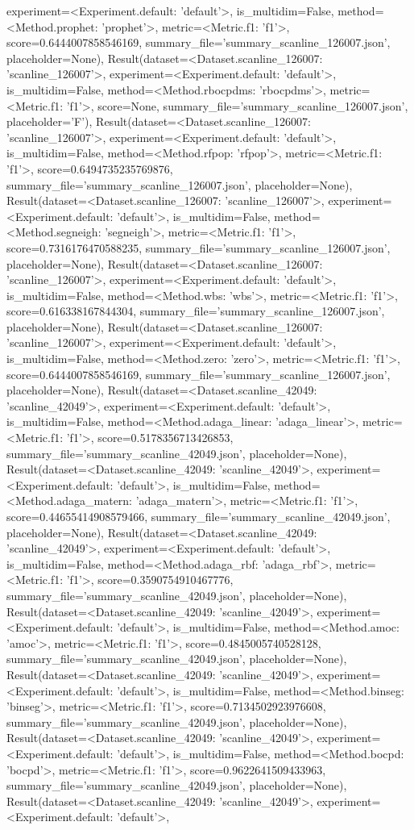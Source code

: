 experiment=<Experiment.default: 'default'>, is_multidim=False, method=<Method.prophet: 'prophet'>, metric=<Metric.f1: 'f1'>, score=0.6444007858546169, summary_file='summary_scanline_126007.json', placeholder=None), Result(dataset=<Dataset.scanline_126007: 'scanline_126007'>, experiment=<Experiment.default: 'default'>, is_multidim=False, method=<Method.rbocpdms: 'rbocpdms'>, metric=<Metric.f1: 'f1'>, score=None, summary_file='summary_scanline_126007.json', placeholder='F'), Result(dataset=<Dataset.scanline_126007: 'scanline_126007'>, experiment=<Experiment.default: 'default'>, is_multidim=False, method=<Method.rfpop: 'rfpop'>, metric=<Metric.f1: 'f1'>, score=0.6494735235769876, summary_file='summary_scanline_126007.json', placeholder=None), Result(dataset=<Dataset.scanline_126007: 'scanline_126007'>, experiment=<Experiment.default: 'default'>, is_multidim=False, method=<Method.segneigh: 'segneigh'>, metric=<Metric.f1: 'f1'>, score=0.7316176470588235, summary_file='summary_scanline_126007.json', placeholder=None), Result(dataset=<Dataset.scanline_126007: 'scanline_126007'>, experiment=<Experiment.default: 'default'>, is_multidim=False, method=<Method.wbs: 'wbs'>, metric=<Metric.f1: 'f1'>, score=0.616338167844304, summary_file='summary_scanline_126007.json', placeholder=None), Result(dataset=<Dataset.scanline_126007: 'scanline_126007'>, experiment=<Experiment.default: 'default'>, is_multidim=False, method=<Method.zero: 'zero'>, metric=<Metric.f1: 'f1'>, score=0.6444007858546169, summary_file='summary_scanline_126007.json', placeholder=None), Result(dataset=<Dataset.scanline_42049: 'scanline_42049'>, experiment=<Experiment.default: 'default'>, is_multidim=False, method=<Method.adaga_linear: 'adaga_linear'>, metric=<Metric.f1: 'f1'>, score=0.5178356713426853, summary_file='summary_scanline_42049.json', placeholder=None), Result(dataset=<Dataset.scanline_42049: 'scanline_42049'>, experiment=<Experiment.default: 'default'>, is_multidim=False, method=<Method.adaga_matern: 'adaga_matern'>, metric=<Metric.f1: 'f1'>, score=0.44655414908579466, summary_file='summary_scanline_42049.json', placeholder=None), Result(dataset=<Dataset.scanline_42049: 'scanline_42049'>, experiment=<Experiment.default: 'default'>, is_multidim=False, method=<Method.adaga_rbf: 'adaga_rbf'>, metric=<Metric.f1: 'f1'>, score=0.3590754910467776, summary_file='summary_scanline_42049.json', placeholder=None), Result(dataset=<Dataset.scanline_42049: 'scanline_42049'>, experiment=<Experiment.default: 'default'>, is_multidim=False, method=<Method.amoc: 'amoc'>, metric=<Metric.f1: 'f1'>, score=0.4845005740528128, summary_file='summary_scanline_42049.json', placeholder=None), Result(dataset=<Dataset.scanline_42049: 'scanline_42049'>, experiment=<Experiment.default: 'default'>, is_multidim=False, method=<Method.binseg: 'binseg'>, metric=<Metric.f1: 'f1'>, score=0.7134502923976608, summary_file='summary_scanline_42049.json', placeholder=None), Result(dataset=<Dataset.scanline_42049: 'scanline_42049'>, experiment=<Experiment.default: 'default'>, is_multidim=False, method=<Method.bocpd: 'bocpd'>, metric=<Metric.f1: 'f1'>, score=0.9622641509433963, summary_file='summary_scanline_42049.json', placeholder=None), Result(dataset=<Dataset.scanline_42049: 'scanline_42049'>, experiment=<Experiment.default: 'default'>, 